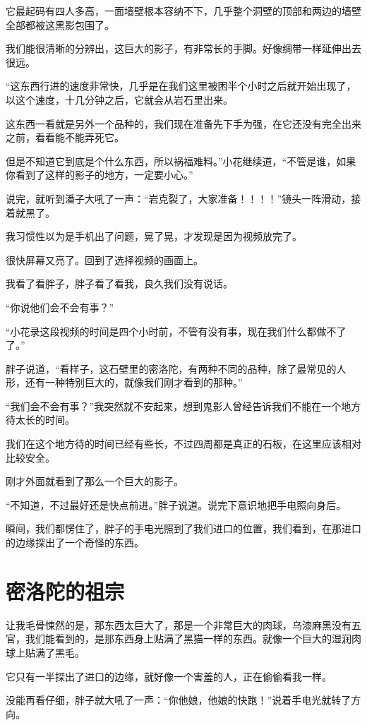 它最起码有四人多高，一面墙壁根本容纳不下，几乎整个洞壁的顶部和两边的墙壁全部都被这黑影包围了。

我们能很清晰的分辨出，这巨大的影子，有非常长的手脚。好像绸带一样延伸出去很远。

“这东西行进的速度非常快，几乎是在我们这里被困半个小时之后就开始出现了，以这个速度，十几分钟之后，它就会从岩石里出来。

这东西一看就是另外一个品种的，我们现在准备先下手为强，在它还没有完全出来之前，看看能不能弄死它。

但是不知道它到底是个什么东西，所以祸福难料。”小花继续道，“不管是谁，如果你看到了这样的影子的地方，一定要小心。”

说完，就听到潘子大吼了一声：“岩克裂了，大家准备！！！！”镜头一阵滑动，接着就黑了。

我习惯性以为是手机出了问题，晃了晃，才发现是因为视频放完了。

很快屏幕又亮了。回到了选择视频的画面上。

我看了看胖子，胖子看了看我，良久我们没有说话。

“你说他们会不会有事？”

“小花录这段视频的时间是四个小时前，不管有没有事，现在我们什么都做不了了。”

胖子说道，“看样子，这石壁里的密洛陀，有两种不同的品种，除了最常见的人形，还有一种特别巨大的，就像我们刚才看到的那种。”

“我们会不会有事？”我突然就不安起来，想到鬼影人曾经告诉我们不能在一个地方待太长的时间。

我们在这个地方待的时间已经有些长，不过四周都是真正的石板，在这里应该相对比较安全。

刚才外面就看到了那么一个巨大的影子。

“不知道，不过最好还是快点前进。”胖子说道。说完下意识地把手电照向身后。

瞬间，我们都愣住了，胖子的手电光照到了我们进口的位置，我们看到，在那进口的边缘探出了一个奇怪的东西。

\chapter{密洛陀的祖宗}

让我毛骨悚然的是，那东西太巨大了，那是一个非常巨大的肉球，乌漆麻黑没有五官，我们能看到的，是那东西身上贴满了黑猫一样的东西。就像一个巨大的湿润肉球上贴满了黑毛。

它只有一半探出了进口的边缘，就好像一个害羞的人，正在偷偷看我一样。

没能再看仔细，胖子就大吼了一声：“你他娘，他娘的快跑！”说着手电光就转了方向。

